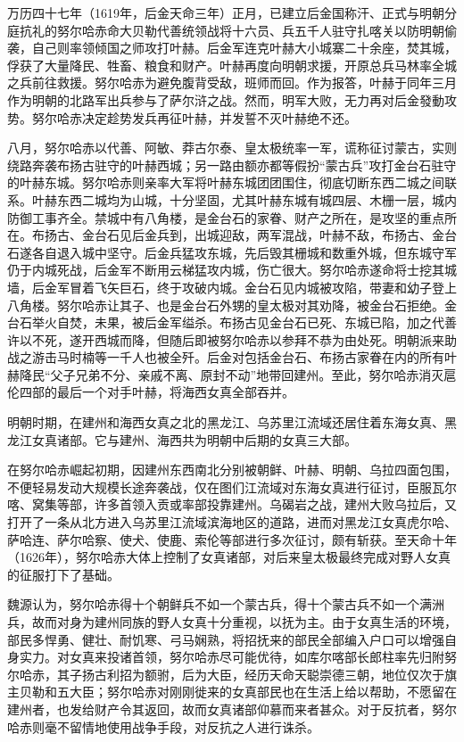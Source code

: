 万历四十七年（1619年，后金天命三年）正月，已建立后金国称汗、正式与明朝分庭抗礼的努尔哈赤命大贝勒代善统领战将十六员、兵五千人驻守扎喀关以防明朝偷袭，自己则率领倾国之师攻打叶赫。后金军连克叶赫大小城寨二十余座，焚其城，俘获了大量降民、牲畜、粮食和财产。叶赫再度向明朝求援，开原总兵马林率全城之兵前往救援。努尔哈赤为避免腹背受敌，班师而回。作为报答，叶赫于同年三月作为明朝的北路军出兵参与了萨尔浒之战。然而，明军大败，无力再对后金發動攻势。努尔哈赤决定趁势发兵再征叶赫，并发誓不灭叶赫绝不还。

八月，努尔哈赤以代善、阿敏、莽古尔泰、皇太极统率一军，谎称征讨蒙古，实则绕路奔袭布扬古驻守的叶赫西城；另一路由额亦都等假扮“蒙古兵”攻打金台石驻守的叶赫东城。努尔哈赤则亲率大军将叶赫东城团团围住，彻底切断东西二城之间联系。叶赫东西二城均为山城，十分坚固，尤其叶赫东城有城四层、木栅一层，城内防御工事齐全。禁城中有八角楼，是金台石的家眷、财产之所在，是攻坚的重点所在。布扬古、金台石见后金兵到，出城迎敌，两军混战，叶赫不敌，布扬古、金台石遂各自退入城中坚守。后金兵猛攻东城，先后毁其栅城和数重外城，但东城守军仍于内城死战，后金军不断用云梯猛攻内城，伤亡很大。努尔哈赤遂命将士挖其城墙，后金军冒着飞矢巨石，终于攻破内城。金台石见内城被攻陷，带妻和幼子登上八角楼。努尔哈赤让其子、也是金台石外甥的皇太极对其劝降，被金台石拒绝。金台石举火自焚，未果，被后金军缢杀。布扬古见金台石已死、东城已陷，加之代善许以不死，遂开西城而降，但随后即被努尔哈赤以参拜不恭为由处死。明朝派来助战之游击马时楠等一千人也被全歼。后金对包括金台石、布扬古家眷在内的所有叶赫降民“父子兄弟不分、亲戚不离、原封不动”地带回建州。至此，努尔哈赤消灭扈伦四部的最后一个对手叶赫，将海西女真全部吞并。

明朝时期，在建州和海西女真之北的黑龙江、乌苏里江流域还居住着东海女真、黑龙江女真诸部。它与建州、海西共为明朝中后期的女真三大部。

在努尔哈赤崛起初期，因建州东西南北分别被朝鲜、叶赫、明朝、乌拉四面包围，不便轻易发动大规模长途奔袭战，仅在图们江流域对东海女真进行征讨，臣服瓦尔喀、窝集等部，许多首领入贡或率部投靠建州。乌碣岩之战，建州大败乌拉后，又打开了一条从北方进入乌苏里江流域滨海地区的道路，进而对黑龙江女真虎尔哈、萨哈连、萨尔哈察、使犬、使鹿、索伦等部进行多次征讨，颇有斩获。至天命十年（1626年），努尔哈赤大体上控制了女真诸部，对后来皇太极最终完成对野人女真的征服打下了基础。

魏源认为，努尔哈赤得十个朝鲜兵不如一个蒙古兵，得十个蒙古兵不如一个满洲兵，故而对身为建州同族的野人女真十分重视，以抚为主。由于女真生活的环境，部民多悍勇、健壮、耐饥寒、弓马娴熟，将招抚来的部民全部编入户口可以增强自身实力。对女真来投诸首领，努尔哈赤尽可能优待，如库尔喀部长郎柱率先归附努尔哈赤，其子扬古利招为额驸，后为大臣，经历天命天聪崇德三朝，地位仅次于旗主贝勒和五大臣；努尔哈赤对刚刚徙来的女真部民也在生活上给以帮助，不愿留在建州者，也发给财产令其返回，故而女真诸部仰慕而来者甚众。对于反抗者，努尔哈赤则毫不留情地使用战争手段，对反抗之人进行诛杀。

